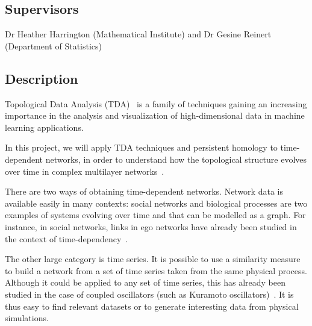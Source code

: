 \documentclass[article,a4paper,11pt,openany,extrafontsizes]{memoir}
\begin{document}
\maketitle



\subsection*{Supervisors}

Dr Heather Harrington (Mathematical Institute) and Dr Gesine Reinert
(Department of Statistics)

\subsection*{Description}

Topological Data Analysis (TDA)~\cite{chazal_introduction_2017,
  oudot_persistence_2015, carlsson_topology_2009,
  edelsbrunner_computational_2010} is a family of techniques gaining
an increasing importance in the analysis and visualization of
high-dimensional data in machine learning applications.

In this project, we will apply TDA techniques and persistent homology
to time-dependent networks, in order to understand how the topological
structure evolves over time in complex multilayer
networks~\cite{kivela_multilayer_2014, porter_dynamical_2014}.

There are two ways of obtaining time-dependent networks. Network data
is available easily in many contexts: social networks and biological
processes are two examples of systems evolving over time and that can
be modelled as a graph. For instance, in social networks, links in ego
networks have already been studied in the context of
time-dependency~\cite{tabourier_predicting_2016}.

The other large category is time series. It is possible to use a
similarity measure to build a network from a set of time series taken
from the same physical process. Although it could be applied to any
set of time series, this has already been studied in the case of
coupled oscillators (such as Kuramoto
oscillators)~\cite{stolz_persistent_2017, schaub_graph_2016}. It is
thus easy to find relevant datasets or to generate interesting data
from physical simulations.
\end{document}
